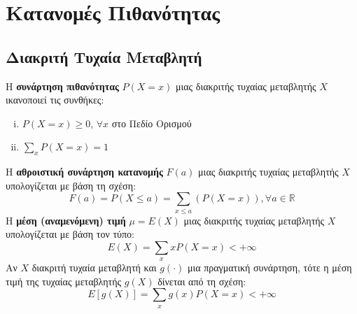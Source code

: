 \section{Κατανομές Πιθανότητας}



\begin{minipage}[t]{.48\textwidth}
  \subsection*{Διακριτή Τυχαία Μεταβλητή}

  Η \textbf{συνάρτηση πιθανότητας} $P(X=x)$ μιας διακριτής τυχαίας μεταβλητής
  $X$ ικανοποιεί τις συνθήκες:
  \begin{enumerate}[i)]
    \item $P(X=x) \geq 0$, $\forall x$ στο Πεδίο Ορισμού
    \item $\sum_{x}P(X=x)=1$
  \end{enumerate}
  Η \textbf{αθροιστική συνάρτηση κατανομής} $F(a)$ μιας διακριτής τυχαίας
  μεταβλητής $X$ υπολογίζεται με βάση τη σχέση:
  \begin{equation*}
    F(a)=P(X\leq a)=\sum_{x\leq a}(P(X=x)), \forall a\in\mathbb{R}
  \end{equation*}
  Η \textbf{μέση (αναμενόμενη) τιμή} $\mu=E(X)$ μιας διακριτής τυχαίας
  μεταβλητής $X$ υπολογίζεται με βάση τον τύπο:
  \begin{equation*}
    E(X)=\sum_{x}xP(X=x)< +\infty
  \end{equation*}
  Αν $X$ διακριτή τυχαία μεταβλητή και $g(\cdot)$ μια πραγματική συνάρτηση, τότε
  η μέση τιμή της τυχαίας μεταβλητής $g(X)$ δίνεται από τη σχέση:
  \begin{equation*}
    E[g(X)]=\sum_{x}g(x)P(X=x)<+\infty
  \end{equation*}
\end{minipage}
\hfill
